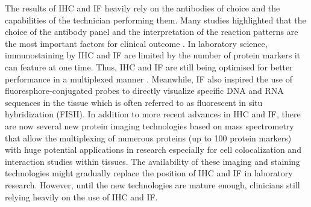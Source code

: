 The results of IHC and IF heavily rely on the antibodies of choice and the capabilities of the technician performing them. Many studies highlighted that the choice of the antibody panel and the interpretation of the reaction patterns are the most important factors for  clinical outcome \cite{de2010immunohistochemistry, jensen1997immunohistochemistry}. In laboratory science, immunostaining by IHC and IF are limited by the number of protein markers it can feature at one time. Thus, IHC and IF are still being optimised for better performance in a multiplexed manner \cite{joshi2017immunofluorescence}. Meanwhile, IF also inspired the use of fluoresphore-conjugated probes to directly visualize specific DNA and RNA sequences in the tissue which is often referred to as fluorescent in situ hybridization (FISH). In addition to more recent advances in IHC and IF, there are now several new protein imaging technologies based on mass spectrometry that allow the multiplexing of numerous proteins (up to 100 protein markers) with huge potential applications in research especially for cell colocalization and interaction studies within tissues. The availability of these imaging and staining technologies might gradually replace the position of IHC and IF in laboratory research. However, until the new technologies are mature enough, clinicians still relying heavily on the use of IHC and IF. 


